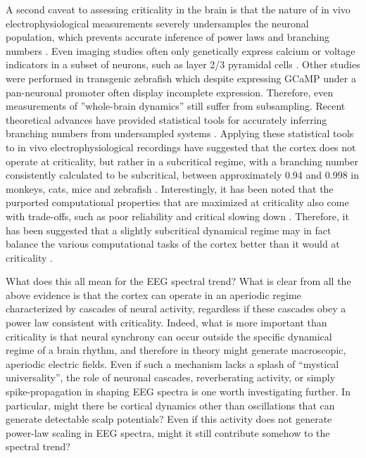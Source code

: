A second caveat to assessing criticality in the brain is that the nature of in vivo electrophysiological measurements severely undersamples the neuronal population, which prevents accurate inference of power laws and branching numbers \cite{Priesemann2009}. Even imaging studies often only genetically express calcium or voltage indicators in a subset of neurons, such as layer 2/3 pyramidal cells \cite{Scott2014,Bellay2015}. Other studies were performed in transgenic zebrafish \cite{Ponce-Alvarez2018} which despite expressing GCaMP under a pan-neuronal promoter often display incomplete expression. Therefore, even measurements of ''whole-brain dynamics'' still suffer from subsampling. Recent theoretical advances have provided statistical tools for accurately inferring branching numbers from undersampled systems \cite{Wilting2018}. Applying these statistical tools to in vivo electrophysiological recordings have suggested that the cortex does not operate at criticality, but rather in a subcritical regime, with a branching number consistently calculated to be subcritical, between approximately 0.94 and 0.998 in monkeys, cats, mice \cite{Wilting2018,Wilting2019} and zebrafish \cite{Suryadi2022}. Interestingly, it has been noted that the purported computational properties that are maximized at criticality also come with trade-offs, such as poor reliability \cite{Gollo2017} and critical slowing down \cite{Scheffer2012, Wilting2019a}. Therefore, it has been suggested that a slightly subcritical dynamical regime may in fact balance the various computational tasks of the cortex better than it would at criticality \cite{Wilting2019a}.

What does this all mean for the EEG spectral trend? What is clear from all the above evidence is that the cortex can operate in an aperiodic regime characterized by cascades of neural activity, regardless if these cascades obey a power law consistent with criticality. Indeed, what is more important than criticality is that neural synchrony can occur outside the specific dynamical regime of a brain rhythm, and therefore in theory might generate macroscopic, aperiodic electric fields. Even if such a mechanism lacks a splash of “mystical universality”, the role of neuronal cascades, reverberating activity, or simply spike-propagation in shaping EEG spectra is one worth investigating further. In particular, might there be cortical dynamics other than oscillations that can generate detectable scalp potentials? Even if this activity does not generate power-law scaling in EEG spectra, might it still contribute somehow to the spectral trend?

